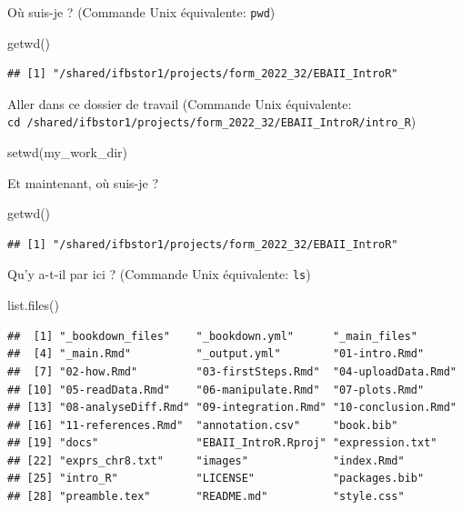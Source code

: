 \documentclass[
]{book}
\newenvironment{Shaded}{\begin{snugshade}}{\end{snugshade}}
\newcommand{\FunctionTok}[1]{\textcolor[rgb]{0.00,0.00,0.00}{#1}}
\newcommand{\NormalTok}[1]{#1}
\begin{document}
Où suis-je ? (Commande Unix équivalente: \texttt{pwd})

\begin{Shaded}
\begin{Highlighting}[]
\FunctionTok{getwd}\NormalTok{()}
\end{Highlighting}
\end{Shaded}

\begin{verbatim}
## [1] "/shared/ifbstor1/projects/form_2022_32/EBAII_IntroR"
\end{verbatim}

Aller dans ce dossier de travail (Commande Unix équivalente: \texttt{cd\ /shared/ifbstor1/projects/form\_2022\_32/EBAII\_IntroR/intro\_R})

\begin{Shaded}
\begin{Highlighting}[]
\FunctionTok{setwd}\NormalTok{(my\_work\_dir)}
\end{Highlighting}
\end{Shaded}

Et maintenant, où suis-je ?

\begin{Shaded}
\begin{Highlighting}[]
\FunctionTok{getwd}\NormalTok{()}
\end{Highlighting}
\end{Shaded}

\begin{verbatim}
## [1] "/shared/ifbstor1/projects/form_2022_32/EBAII_IntroR"
\end{verbatim}

Qu'y a-t-il par ici ? (Commande Unix équivalente: \texttt{ls})

\begin{Shaded}
\begin{Highlighting}[]
\FunctionTok{list.files}\NormalTok{()}
\end{Highlighting}
\end{Shaded}

\begin{verbatim}
##  [1] "_bookdown_files"    "_bookdown.yml"      "_main_files"       
##  [4] "_main.Rmd"          "_output.yml"        "01-intro.Rmd"      
##  [7] "02-how.Rmd"         "03-firstSteps.Rmd"  "04-uploadData.Rmd" 
## [10] "05-readData.Rmd"    "06-manipulate.Rmd"  "07-plots.Rmd"      
## [13] "08-analyseDiff.Rmd" "09-integration.Rmd" "10-conclusion.Rmd" 
## [16] "11-references.Rmd"  "annotation.csv"     "book.bib"          
## [19] "docs"               "EBAII_IntroR.Rproj" "expression.txt"    
## [22] "exprs_chr8.txt"     "images"             "index.Rmd"         
## [25] "intro_R"            "LICENSE"            "packages.bib"      
## [28] "preamble.tex"       "README.md"          "style.css"
\end{verbatim}
\end{document}
